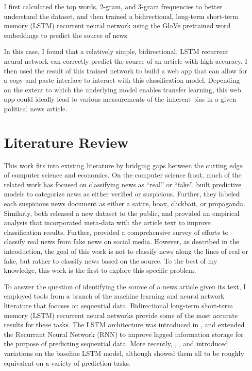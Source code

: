 \documentclass{article}
\begin{document}
		I first calculated the top words, 2-gram, and 3-gram frequencies to better understand the dataset, and then trained a bidirectional, long-term short-term memory (LSTM) recurrent neural network using the GloVe pretrained word embeddings to predict the source of news. 
		
		In this case, I found that a relatively simple, bidirectional, LSTM recurrent neural network can correctly predict the source of an article with high accuracy. I then used the result of this trained network to build a web app that can allow for a copy-and-paste interface to interact with this classification model. Depending on the extent to which the underlying model enables transfer learning, this web app could ideally lead to various measurements of the inherent bias in a given political news article.  
		
		\section{Literature Review}
		
		This work fits into existing literature by bridging gaps between the cutting edge of computer science and economics. On the computer science front, much of the related work has focused on classifying news as ``real'' or ``fake''. \citet{volkova2017separating} built predictive models to categorize news as either verified or suspicious. Further, they labeled each suspicious news document as either a satire, hoax, clickbait, or propaganda. Similarly, \citet{wang2017liar} both released a new dataset to the public, and provided an empirical analysis that incorporated meta-data with the article text to improve classification results. Further, \citet{shu2017fake} provided a comprehensive survey of efforts to classify real news from fake news on social media. However, as described in the introduction, the goal of this work is not to classify news along the lines of real or fake, but rather to classify news based on the source. To the best of my knowledge, this work is the first to explore this specific problem. 
		
		To answer the question of identifying the source of a news article given its text, I employed tools from a branch of the machine learning and neural network literature that focuses on sequential data. Bidirectional long-term short-term memory (LSTM) recurrent neural networks provide some of the most accurate results for these tasks. The LSTM architecture was introduced in \citet{hochreiter1997long}, and extended the Recurrant Neural Network (RNN) to improve lagged information storage for the purpose of predicting sequential data. More recently, \citet{gers2000recurrent}, \citet{chung2014empirical}, and \citet{yao2015depth} introduced variations on the baseline \citet{hochreiter1997long} LSTM model, although \citet{greff2016lstm} showed them all to be roughly equivalent on a variety of prediction tasks. 
		
\end{document}
